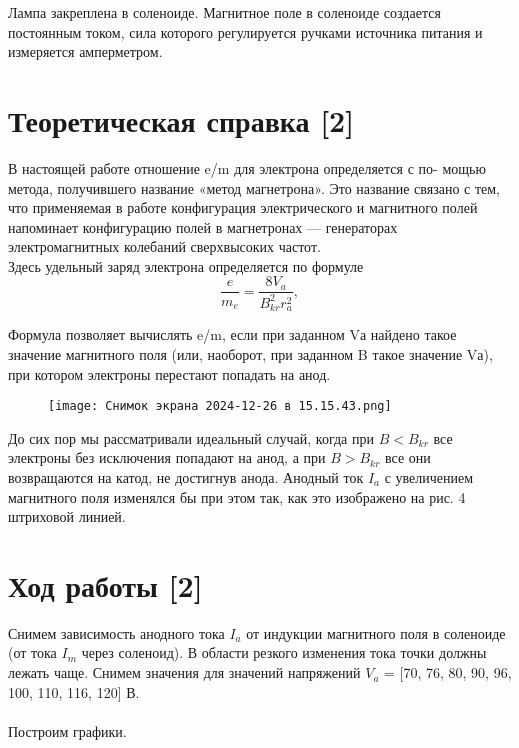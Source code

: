 \documentclass[a4paper,12pt]{article}
\theoremstyle{definition}
\begin{document}
Лампа закреплена в соленоиде. Магнитное поле в соленоиде создается постоянным током, сила которого регулируется ручками источника питания и измеряется амперметром.

\section{Теоретическая справка [2]}

В настоящей работе отношение e/m для электрона определяется с по-
мощью метода, получившего название «метод магнетрона». Это название
связано с тем, что применяемая в работе конфигурация электрического
и магнитного полей напоминает конфигурацию полей в магнетронах —
генераторах электромагнитных колебаний сверхвысоких частот.\\

Здесь удельный заряд электрона определяется по формуле
\begin{equation}
\dfrac{e}{m_e} = \dfrac{8V_a}{B_{kr}^2 r_a^2},
\end{equation}

Формула позволяет вычислять e/m, если при заданном Vа найдено такое значение магнитного поля (или, наоборот, при заданном B такое значение Vа), при котором электроны перестают попадать на анод.

\begin{figure}[H]
    \centering
    \texttt{[image: Снимок экрана 2024-12-26 в 15.15.43.png]}

\end{figure}

До сих пор мы рассматривали идеальный случай, когда при $B < B_{kr}$ все электроны без исключения попадают на анод, а при $ B > B_{kr}$ все они возвращаются на катод, не достигнув анода. Анодный ток $I_a$ с увеличением магнитного поля изменялся бы при этом так, как это изображено на рис. 4 штриховой линией.


\section{Ход работы [2]}

Снимем зависимость анодного тока $I_a$ от индукции магнитного поля в соленоиде (от тока $I_m$ через соленоид). В области резкого изменения тока точки должны лежать чаще. Снимем значения для значений напряжений $V_a$ = [70, 76, 80, 90, 96, 100, 110, 116, 120] $В$.\\
\\
Построим графики.
\end{document}
